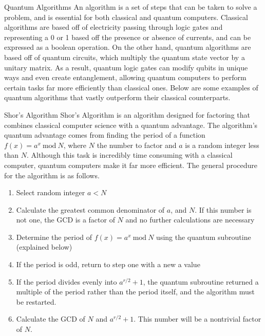 \documentclass[final, 20pt]{beamer}
\newlength{\onecolwid}
\begin{document}
\begin{frame}[t]
\begin{columns}[t]
\begin{column}{\onecolwid}
\begin{block}{Quantum Algorithms}
An algorithm is a set of steps that can be taken to solve a problem, and is essential for both classical and quantum computers. Classical algorithms are based off of electricity passing through logic gates and representing a 0 or 1 based off the presence or absence of currents, and can be expressed as a boolean operation. On the other hand, quantum algorithms are based off of quantum circuits, which multiply the quantum state vector by a unitary matrix. As a result, quantum logic gates can modify qubits in unique ways and even create entanglement, allowing quantum computers to perform certain tasks far more efficiently than classical ones. Below are some examples of quantum algorithms that vastly outperform their classical counterparts. 
\end{block}

\begin{block}{Shor's Algorithm}
Shor's Algorithm is an algorithm designed for factoring that combines classical computer science with a quantum advantage. The algorithm's quantum advantage comes from finding the period of a function $f(x) = a^x \ \text{mod} \ N$, where $N$ the number to factor and $a$ is a random integer less than $N$. Although this task is incredibly time consuming with a classical computer, quantum computers make it far more efficient. The general procedure for the algorithm is as follows.
\begin{enumerate}
\item Select random integer $a < N$
\item Calculate the greatest common denominator of $a$, and $N$. If this number is not one, the GCD is a factor of $N$ and no further calculations are necessary
\item Determine the period of $f(x) = a^x \ \text{mod} \ N$ using the quantum subroutine (explained below)
\item If the period is odd, return to step one with a new a value
\item If the period divides evenly into $a^{r/2} + 1$, the quantum subroutine returned a multiple of the period rather than the period itself, and the algorithm must be restarted.
\item Calculate the GCD of $N$ and $a^{r/2} + 1$. This number will be a nontrivial factor of $N$. 
\end{enumerate}
\end{block}


\end{column}
\end{columns}
\end{frame}
\end{document}
